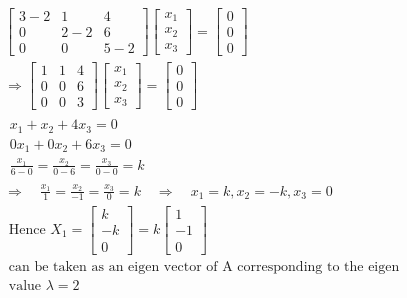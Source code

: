 \begin{answer}
\begin{align*}
 		\left[\begin{array}{lll}
 			3-2 & 1 & 4 \\
 			0 & 2-2 & 6 \\
 			0 & 0 & 5-2
 		\end{array}\right]\left[\begin{array}{l}
 			x_{1} \\
 			x_{2} \\
 			x_{3}
 		\end{array}\right]=\left[\begin{array}{l}
 			0 \\
 			0 \\
 			0
 		\end{array}\right]\\
 		\Rightarrow\left[\begin{array}{lll}
 			1 & 1 & 4 \\
 			0 & 0 & 6 \\
 			0 & 0 & 3
 		\end{array}\right]\left[\begin{array}{l}
 			x_{1} \\
 			x_{2} \\
 			x_{3}
 		\end{array}\right]=\left[\begin{array}{l}
 			0 \\
 			0 \\
 			0
 		\end{array}\right]\\
 		\begin{array}{r}
 			x_{1}+x_{2}+4 x_{3}=0 \\
 			0 x_{1}+0 x_{2}+6 x_{3}=0 \\
 			\frac{x_{1}}{6-0}=\frac{x_{2}}{0-6}=\frac{x_{3}}{0-0}=k
 		\end{array}\\
 		\Rightarrow \quad \frac{x_{1}}{1}=\frac{x_{2}}{-1}=\frac{x_{3}}{0}=k \quad \Rightarrow \quad x_{1}=k, x_{2}=-k, x_{3}=0\\
 		\text { Hence } X_{1}=\left[\begin{array}{r}
 			k \\
 			-k \\
 			0
 		\end{array}\right]=k\left[\begin{array}{r}
 			1 \\
 			-1 \\
 			0
 		\end{array}\right] \\
 		\text { can be taken as an eigen vector of A corresponding to the eigen } \\
 		\text { value } \lambda=2
 	\end{align*}
 \end{answer}
	



